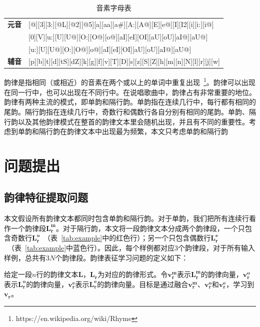 \begin{table}[h]
\centering
\caption{音素字母表}
\label{table:alphabet}
\renewcommand{\arraystretch}{1.3}
\begin{tabular}{ll}
\toprule
\textbf{元音} & {[}@{]}{[}3{]}{[}3:{]}{[}@L{]}{[}@2{]}{[}@5{]}{[}a{]}{[}aa{]}{[}a\#{]}{[}A:{]}{[}A@{]}{[}E{]}{[}e@{]}{[}I{]}{[}I2{]}{[}i{]}{[}i:{]}{[}i@{]}                                \\
\textbf{}   & {[}0{]}{[}V{]}{[}u:{]}{[}U{]}{[}U@{]}{[}O:{]}{[}O@{]}{[}o@{]}{[}aI{]}{[}eI{]}{[}OI{]}{[}aU{]}{[}oU{]}{[}aI@{]}{[}aU@{]}                                                    \\
\textbf{}   & {[}u:{]}{[}U{]}{[}U@{]}{[}O:{]}{[}O@{]}{[}o@{]}{[}aI{]}{[}eI{]}{[}OI{]}{[}aU{]}{[}oU{]}{[}aI@{]}{[}aU@{]}                                                                  \\ \midrule
\textbf{辅音} & {[}p{]}{[}b{]}{[}t{]}{[}d{]}{[}tS{]}{[}dZ{]}{[}k{]}{[}g{]}{[}f{]}{[}v{]}{[}T{]}{[}D{]}{[}s{]}{[}z{]}{[}S{]}{[}Z{]}{[}h{]}{[}m{]}{[}n{]}{[}N{]}{[}l{]}{[}r{]}{[}j{]}{[}w{]} \\ [2pt]\bottomrule
\end{tabular}
\renewcommand{\arraystretch}{1}
\end{table}

\par

韵律是指相同（或相近）的音素在两个或以上的单词中重复出现~\footnote{https://en.wikipedia.org/wiki/Rhyme}。韵律可以出现在同一行中，也可以出现在不同行中。在说唱歌曲中，韵律占有非常重要的地位。韵律有两种主流的模式，即单韵和隔行韵。单韵指在连续几行中，每行都有相同的尾韵。隔行韵指在连续几行中，奇数行和偶数行各自分别有相同的尾韵。单韵、隔行韵以及其他韵律模式在整首的韵律文本里会随机出现，并且有不同的重要性。考虑到单韵和隔行韵在韵律文本中出现最为频繁，本文只考虑单韵和隔行韵\par

\section {问题提出}
\subsection{韵律特征提取问题}
本文假设所有韵律文本都同时包含单韵和隔行韵。对于单韵，我们把所有连续行看作一个韵律段$\bm {L_{r}^{m}}$。对于隔行韵，本文将一段韵律文本分成两个韵律段，一个只包含奇数行$\bm {L_{r}^{o}}$~（表~\ref{tab:example}中的红色行）；另一个只包含偶数行$\bm {L_{r}^{e}}$~（表~\ref{tab:example}中蓝色行）。因此，每个样例都对应3个韵律段，对于所有输入样例，总共有$3N$个韵律段。韵律表征学习问题的定义如下：
\begin{mydef}
  \label{p:rhyme}
  给定一段$n$行的韵律文本$\bm L$，$\bm {L_r}$为对应的韵律形式。令$\bm {v_{r}^{m}}$表示$\bm {L_r^{m}}$的韵律向量，$\bm {v_{r}^{o}}$表示$\bm {L_r^{o}}$的韵律向量，$\bm {v_{r}^{e}}$表示$\bm {L_r^{e}}$的韵律向量。目标是通过融合$\bm {v_{r}^{m}}$、$\bm {v_{r}^{o}}$和$\bm {v_{r}^{e}}$，学习到$\bm {v_r}$。
\end{mydef}
\par

